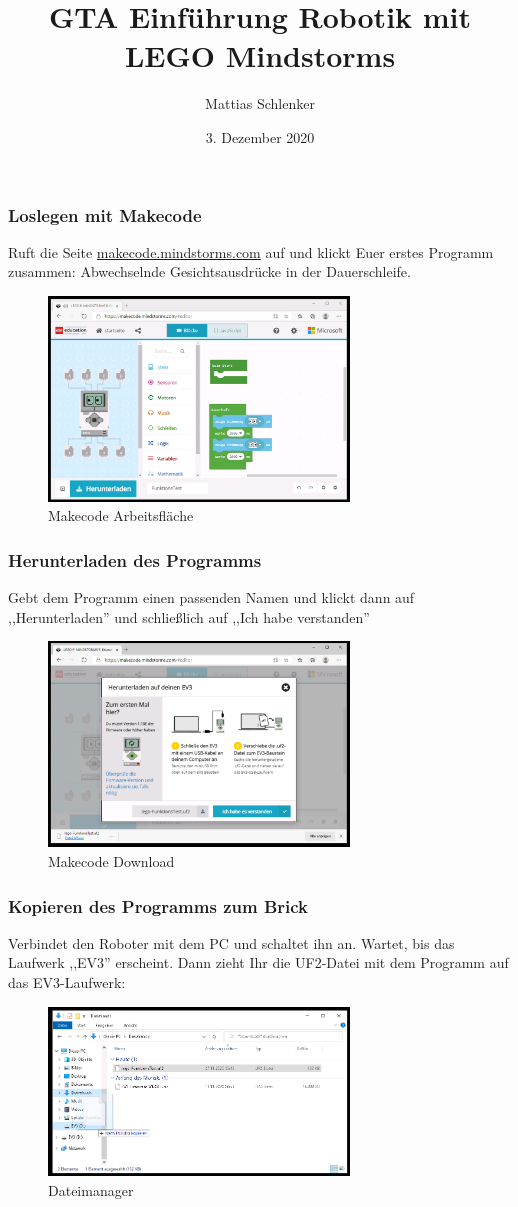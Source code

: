 \documentclass{beamer}
\title{GTA Einführung Robotik mit LEGO Mindstorms}
\author{Mattias Schlenker}
\institute{Wilhelm-Ostwald-Gymnasium}
\date{3. Dezember 2020}
\begin{document}
\frame{\titlepage}

\begin{frame}
\frametitle{Loslegen mit Makecode}
Ruft die Seite \href{https://makecode.mindstorms.com/}{makecode.mindstorms.com} auf und klickt Euer erstes Programm zusammen: Abwechselnde Gesichtsausdrücke in der Dauerschleife.

\begin{figure}
  \includegraphics[width=8cm]{mkcd00.png}
  \caption{Makecode Arbeitsfläche}
  \label{fig:mkcd0}
\end{figure}
\end{frame}


\begin{frame}
\frametitle{Herunterladen des Programms}
Gebt dem Programm einen passenden Namen und klickt dann auf ,,Herunterladen'' und schließlich auf ,,Ich habe verstanden''

\begin{figure}
  \includegraphics[width=8cm]{mkcd01.png}
  \caption{Makecode Download}
  \label{fig:mkcd1}
\end{figure}
\end{frame}

\begin{frame}
\frametitle{Kopieren des Programms zum Brick}
Verbindet den Roboter mit dem PC und schaltet ihn an. Wartet, bis das Laufwerk ,,EV3'' erscheint. Dann zieht Ihr die UF2-Datei mit dem Programm auf das EV3-Laufwerk:

\begin{figure}
  \includegraphics[width=8cm]{mkcd02.png}
  \caption{Dateimanager}
  \label{fig:mkcd2}
\end{figure}
\end{frame}
\end{document}
